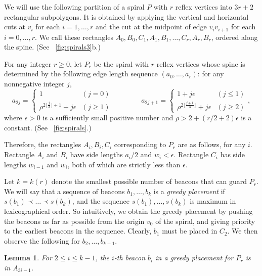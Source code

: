 \documentclass[11pt]{article}
\newtheorem{lemma}{Lemma}
\theoremstyle{definition}
\let\geq\geqslant
\let\leq\leqslant
\begin{document}
We will use the following partition of a spiral $P$ with $r$ reflex vertices 
into $3r+2$ rectangular subpolygons. It is obtained
by applying the vertical and horizontal cuts at $v_i$ for each $i=1, \ldots, r$
and the cut at the midpoint of edge $v_iv_{i+1}$ for each $i=0, \ldots, r$.
We call these rectangles $A_0, B_0, C_1, A_1, B_1, \ldots, C_r, A_r, B_r$, ordered along
the spine. (See \figurename~\ref{fig:spirals3}b.)

For any integer $r\geq 0$, let $P_r$ be the spiral with $r$ reflex vertices
whose spine is determined by the following edge length sequence $(a_0, \ldots, a_r)$:
for any nonnegative integer $j$,
\[
  a_{2j} =  \begin{cases}
                    1 & (j = 0)\\
                    \rho^{2 \lfloor \frac{j}{3} \rfloor + 1} + j\epsilon & (j \geq 1)

                  \end{cases}
  \qquad\qquad
  a_{2j+1} =  \begin{cases}
                    1 + j\epsilon & (j \leq 1)\\
                    \rho^{2 \lfloor \frac{j+1}{3} \rfloor } + j\epsilon & (j \geq 2)
                  \end{cases},
\]
where $\epsilon > 0$ is a sufficiently small positive number
and $\rho > 2 + (r / 2 + 2)\epsilon$ is a constant.
(See \figurename~\ref{fig:spirals}.)

Therefore, the rectangles $A_i,B_i,C_i$ corresponding to $P_r$ are as follows, for any $i$.
Rectangle  $A_i$ and $B_i$ have side lengths $a_i/2$ and $w_i < \epsilon$.
Rectangle $C_i$ has side lengths $w_{i-1}$ and $w_i$, both of which are strictly less than $\epsilon$.

Let $k=k(r)$ denote the smallest possible number of beacons that can guard $P_r$. We will
say that a sequence of beacons $b_1,\dots, b_k$ is a {\it greedy placement} if 
$s(b_1) \prec \dots \prec s(b_k)$, and the
sequence $s(b_1),\dots,s(b_k)$ is maximum in lexicographical order. 
So intuitively, we obtain the greedy placement
by pushing the beacons as far as possible from the origin $v_0$ of the spiral, and giving
priority to the earliest beacons in the sequence.
Clearly, $b_1$ must be placed in $C_2$.
We then observe the following for $b_2, \ldots, b_{k-1}$.
\begin{lemma} \label{lem:spiral_sub}
 For $2\leq i\leq k-1$, the $i$-th beacon $b_i$ in a greedy placement for $P_r$
 is  in $A_{3i-1}$.
\end{lemma}
\end{document}
